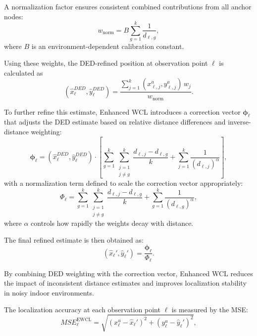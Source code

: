 \documentclass[journal]{IEEEtran}
\begin{document}
A normalization factor ensures consistent combined contributions from all anchor nodes:
\begin{equation}
\label{normal}
w_{\text{norm}} = B \sum_{g=1}^{k} \frac{1}{d_{\ell,g}},
\end{equation}
where $B$ is an environment-dependent calibration constant.  

Using these weights, the DED-refined position at observation point $\ell$ is calculated as
\begin{equation}
\label{hasil}
(\hat{x}_\ell^{DED}, \hat{y}_\ell^{DED}) 
= \frac{\sum_{j=1}^{k} (x^a_{\ell,j}, y^a_{\ell,j}) \, w_j}{w_{\text{norm}}}.
\end{equation}

To further refine this estimate, Enhanced WCL introduces a correction vector $\boldsymbol{\phi}_\ell$ that adjusts the DED estimate based on relative distance differences and inverse-distance weighting:
\begin{equation}
\boldsymbol{\phi}_\ell = (\hat{x}_\ell^{DED}, \hat{y}_\ell^{DED})
\cdot \left[
\sum_{g=1}^{k} \sum_{\substack{j=1 \\ j \neq g}}^{k} \frac{d_{\ell,j} - d_{\ell,g}}{k} 
+ \sum_{j=1}^{k} \frac{1}{(d_{\ell,j})^\alpha}
\right],
\end{equation}
with a normalization term defined to scale the correction vector appropriately:
\begin{equation}
\Phi_\ell = \sum_{g=1}^{k} \sum_{\substack{j=1 \\ j \neq g}}^{k} \frac{d_{\ell,j} - d_{\ell,g}}{k} 
+ \sum_{g=1}^{k} \frac{1}{(d_{\ell,g})^\alpha},
\end{equation}
where $\alpha$ controls how rapidly the weights decay with distance.  

The final refined estimate is then obtained as:
\begin{equation}
\label{delapan}
(\hat{x}_\ell', \hat{y}_\ell') = \frac{\boldsymbol{\phi}_\ell}{\Phi_\ell}.
\end{equation}

By combining DED weighting with the correction vector, Enhanced WCL reduces the impact of inconsistent distance estimates and improves localization stability in noisy indoor environments.

The localization accuracy at each observation point $\ell$ is measured by the MSE:
\begin{equation}
\label{MSE}
MSE_{\ell}^{\text{EWCL}} = \sqrt{(x^u_\ell - \hat{x}_\ell')^2 + (y^u_\ell - \hat{y}_\ell')^2},
\end{equation}
\end{document}
